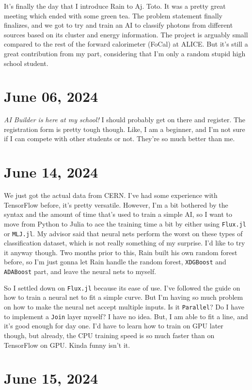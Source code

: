 It's finally the day that I introduce Rain to Aj. Toto. It was a pretty great meeting which ended with some green tea. The problem statement finally finalizes, and we got to try and train an AI to classify photons from different sources based on its cluster and energy information. The project is arguably small compared to the rest of the forward calorimeter (FoCal) at ALICE. But it's still a great contribution from my part, considering that I'm only a random stupid high school student.

\section{June 06, 2024}

\emph{AI Builder is here at my school!} I should probably get on there and register. The registration form is pretty tough though. Like, I am a beginner, and I'm not sure if I can compete with other students or not. They're so much better than me.

\section{June 14, 2024}

We just got the actual data from CERN. I've had some experience with TensorFlow before, it's pretty versatile. However, I'm a bit bothered by the syntax and the amount of time that's used to train a simple AI, so I want to move from Python to Julia to ace the training time a bit by either using \texttt{Flux.jl} or \texttt{MLJ.jl}. My advisor said that neural nets perform the worst on these types of classification dataset, which is not really something of my surprise. I'd like to try it anyway though. Two months prior to this, Rain built his own random forest before, so I'm just gonna let Rain handle the random forest, \texttt{XDGBoost} and \texttt{ADABoost} part, and leave the neural nets to myself.

So I settled down on \texttt{Flux.jl} because its ease of use. I've followed the guide on how to train a neural net to fit a simple curve. But I'm having so much problem on how to make the neural net accept multiple inputs. Is it \texttt{Parallel}? Do I have to implement a \texttt{Join} layer myself? I have no idea. But, I am able to fit a line, and it's good enough for day one. I'd have to learn how to train on GPU later though, but already, the CPU training speed is so much faster than on TensorFlow on GPU. Kinda funny isn't it.

\section{June 15, 2024}

